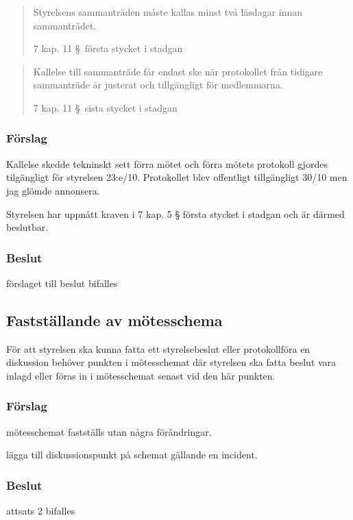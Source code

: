 \documentclass[protokoll]{dvd}
\begin{document}
\blockquote[7 kap. 11 \S~första stycket i stadgan]{
Styrelsens sammanträden måste kallas minst två läsdagar innan sammanträdet. }

\blockquote[7 kap. 11 \S~sista stycket i stadgan]{
Kallelse till sammanträde får endast ske när protokollet från tidigare sammanträde är justerat och tillgängligt för medlemmarna.}

\subsubsection*{Förslag}
Kallelse skedde tekninskt sett förra mötet och förra mötets protokoll gjordes tilgängligt för styrelsen 23:e/10. Protokollet blev offentligt tillgängligt 30/10 men jag glömde annonsera. 
\begin{attsatser}
    \item Styrelsen har uppnått kraven i 7 kap. 5 § första stycket i stadgan och är därmed beslutbar.
\end{attsatser}
\subsubsection*{Beslut}
\begin{attsatser}
    \item förslaget till beslut bifalles
\end{attsatser}


\subsection{Fastställande av mötesschema}

För att styrelsen ska kunna fatta ett styrelsebeslut eller protokollföra en diskussion behöver punkten i mötesschemat där styrelsen ska fatta beslut vara inlagd eller föras in i mötesschemat senast vid den här punkten.

\subsubsection*{Förslag}

\begin{attsatser}
    \item mötesschemat fastställs utan några förändringar.
    \item lägga till diskussionspunkt på schemat gällande en incident. 
\end{attsatser}
\subsubsection*{Beslut}
\begin{attsatser}
    \item attsats 2 bifalles
\end{attsatser}
\end{document}
